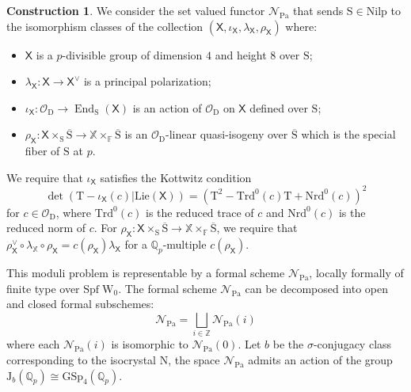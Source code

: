 \documentclass[10pt]{amsart}
\numberwithin{equation}{section}
\theoremstyle{definition}
\newtheorem{construction}[equation]{Construction}
\def\GSp{\mathrm{GSp}}
\def\Nilp{\mathrm{Nilp}}
\def\Lie{\mathrm{Lie}}
\def\Pa{\mathrm{Pa}}
\DeclareMathOperator{\End}{End}
\def\calN{\mathcal{N}}
\def\calO{\mathcal{O}}
\def\FF{\mathbb{F}}
\def\QQ{\mathbb{Q}}
\def\XX{\mathbb{X}}
\def\sfX{\mathsf{X}}
\def\ZZ{\mathbb{Z}}
\def\rmD{\mathrm{D}}
\def\rmJ{\mathrm{J}}
\def\rmN{\mathrm{N}}
\def\rmS{\mathrm{S}}
\def\rmT{\mathrm{T}}
\def\Spf{\mathrm{Spf}}
\begin{document}
\begin{construction}
We consider the set valued functor $\mathcal{N}_{\mathrm{Pa}}$ that sends $\rmS\in\Nilp$ to the isomorphism classes of the collection $(\sfX, \iota_{\sfX},  \lambda_{\sfX}, \rho_{\sfX})$ where:
\begin{itemize} 
\item $\mathsf{X}$ is a $p$-divisible group of dimension $4$ and height $8$ over $\rmS$;
\item $\lambda_{\mathsf{X}}: \sfX\rightarrow \sfX^{\vee}$ is a principal polarization;
\item $\iota_{\sfX}: \calO_{\rmD}\rightarrow \End_{\rmS}(\sfX)$ is an action of $\calO_{\rmD}$ on $\sfX$ defined over $\rmS$;
\item $\rho_{\sfX}: \sfX\times_{\rmS} \overline{\rmS}\rightarrow \XX\times_{\FF}\overline{\rmS}$ is an $\calO_{\rmD}$-linear quasi-isogeny over $\overline{\rmS}$ which is the special fiber of $\rmS$ at $p$.
\end{itemize}

We require that $\iota_{\sfX}$ satisfies the Kottwitz condition 
\begin{equation*}
\det(\rmT-\iota_{\sfX}(c)\vert \Lie(\sfX))=(\rmT^{2}-\mathrm{Trd}^{0}(c)\rmT+ \mathrm{Nrd}^{0}(c))^{2}
\end{equation*}
for $c\in\mathcal{O}_{\rmD}$, where $\mathrm{Trd}^{0}(c)$ is the reduced trace of $c$ and $\mathrm{Nrd}^{0}(c)$ is the reduced norm of $c$. For $\rho_{\sfX}: \sfX\times_{\rmS} \overline{\rmS}\rightarrow \XX\times_{\FF}\overline{\rmS}$, we require that $\rho_{\sfX}^{\vee}\circ\lambda_{\XX}\circ\rho_{\sfX}=c(\rho_{\sfX})\lambda_{\sfX}$
for a $\QQ_{p}$-multiple $c(\rho_{\sfX})$. 
\end{construction}

This moduli problem is representable by a formal scheme $\calN_{\Pa}$, locally formally of finite type over $\Spf\phantom{.}\mathrm{W}_{0}$. The formal scheme $\calN_{\Pa}$ can be decomposed into open and closed formal subschemes: 
\begin{equation*}
\calN_{\Pa}=\bigsqcup_{i\in\ZZ}\calN_{\Pa}(i) 
\end{equation*}
where each $\calN_{\Pa}(i)$ is isomorphic to $\calN_{\Pa}(0)$. Let $b$ be the $\sigma$-conjugacy class corresponding to the isocrystal $\rmN$, the space $\calN_{\Pa}$ admits an action of the group $\rmJ_{b}(\QQ_{p})\cong \GSp_{4}(\QQ_{p})$. 
\end{document}
